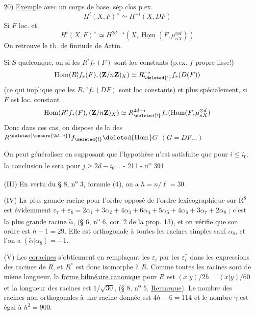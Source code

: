 20) \uline{Exemple}  avec un corps de base, sép clos p.ex.
\[
H^i_!(X,F)^\vee\simeq H^{-i}(X,DF)
\]
Si $F$ loc. ct.
\[
H^i_!(X,F)^\vee\simeq H^{2d-i}(X,\underline{\operatorname{Hom}}(F,\mu_{nX}^{\otimes d}))
\]
On retrouve le th. de finitude de Artin.

Si $S$ quelconque, on  si les $R^i_!f_*(F)$ sont loc constants (p.ex. $f$ propre lisse!)
\[
\operatorname{Hom}(R^i_!f_*(F),(\mathbf{Z}/n\mathbf{Z})_X)\simeq R^{-i}_{\deleted{!}}f_*(D(F))
\]
(ce qui implique que les $R^{-i}_!f_*(DF)$ sont loc constants) et plus spécialement, si $F$ est loc. constant
\[
\operatorname{Hom}(R^i_!f_*(F),(\mathbf{Z}/n\mathbf{Z})_X)\simeq R^{2d-i}_{\deleted{!}}f_*(\operatorname{Hom}(F,\mu_{nX}^{\otimes d})
\]
Donc dans ces cas, on dispose de la  des $R^{\deleted{\unsure{2d-i}}}f_{\deleted{!}}\deleted{\operatorname{Hom}}G$ $(G=DF\ldots)$

On peut généraliser en supposant que l'hypothèse n'est satisfaite que pour $i\leq i_0$, la conclusion le sera pour $j\geq2d-i_0\ldots$
- 211 - \hfill n\textsuperscript{o} 391

(III) En vertu du § 8, n\textsuperscript{o} 3, formule (4), on a $h=n/\ell=30$.

(IV) La plus grande racine pour l'ordre opposé de l'ordre lexicographique sur $\mathrm{R}^8$ est évidemment $\varepsilon_7+\varepsilon_8=2\alpha_1+3\alpha_2+4\alpha_3+6\alpha_4+5\alpha_5+4\alpha_6+3\alpha_7+2\alpha_8$ ; c'est la plus grande racine $\widetilde\alpha$, (§ 6, n\textsuperscript{o} 6, cor. 2 de la prop. 13), et on vérifie que son ordre est $h-1=29$. Elle est orthogonale à toutes les racines simples sauf $\alpha_8$, et l'on a $(\widetilde\alpha|\alpha_8)=-1$.

(V) Les \uline{coracines} s'obtiennent en remplaçant les $\varepsilon_i$ par les $\varepsilon_i^*$ dans les expressions des racines de $R$, et $R^*$ est donc isomorphe à $R$. Comme toutes les racines sont de même longueur, la \uline{forme bilinéaire canonique} pour $R$ est $(x|y)/2h=(x|y)/60$ et la longueur des racines est $1/\sqrt{30}$, (§ 8, n\textsuperscript{o} 5, \uline{Remarque}). Le nombre des racines non orthogonales à une racine donnée est $4h-6=114$ et le nombre $\gamma$ est égal à $h^2=900$.

